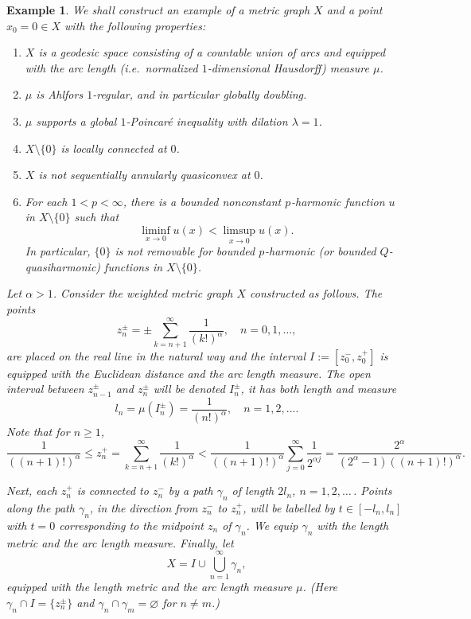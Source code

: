 \documentclass[a4paper,twoside]{article}
\theoremstyle{propositional}
\theoremstyle{descriptive}
\newtheorem{example}[thm]{Example}
\theoremstyle{remarkstyle}
\newcommand{\setm}{\setminus}
\renewcommand{\emptyset}{\varnothing}
\newcommand{\al}{\alpha}
\newcommand{\ga}{\gamma}
\newcommand{\la}{\lambda}
\newcommand{\p}{{$p\mspace{1mu}$}}
\newcommand{\zpm}{z^\pm}
\newcommand{\zpl}{z^+}
\newcommand{\zmin}{z^-}
\newcommand{\Ipm}{I^\pm}
\numberwithin{equation}{section}
\begin{document}
\begin{example}  \label{ex-factorial2}
We shall construct
an example of a metric graph $X$ and a point $x_0=0 \in X$ 
with the following properties:
\begin{enumerate}
\item \label{e-1}
$X$ is a geodesic space consisting of a
countable union of arcs and equipped with the arc length 
(i.e.\ normalized $1$-dimensional Hausdorff) 
measure $\mu$. 
\item \label{e-2}
$\mu$ is Ahlfors $1$-regular, and in particular globally doubling.
\item \label{e-3}
$\mu$ supports a global $1$-Poincar\'e inequality with dilation $\la=1$.
\item \label{e-4}
$X \setm \{0\}$ is locally connected at $0$.
\item \label{e-5}
$X $ is not sequentially annularly quasiconvex at $0$.
\item \label{e-6} 
For each $1<p<\infty$, 
there is a bounded nonconstant \p-harmonic function $u$ in $X \setm \{0\}$
such that 
\[
 \liminf_{x\to0} u(x) < \limsup_{x\to0} u(x). 
\]
In particular, $\{0\}$ is not removable for
bounded \p-harmonic (or bounded $Q$-quasiharmonic) functions
in $X \setm \{0\}$.
\end{enumerate}




Let $\al>1$. 
Consider the weighted metric graph $X$ constructed as follows.
The points 
\[
\zpm_n=\pm \sum_{k=n+1}^\infty \frac{1}{(k!)^\al}, \quad 
n=0,1,\dots, 
\] 
are placed on the real line in the natural way and the interval 
$I:=[\zmin_0,\zpl_0]$ is 
equipped with the Euclidean distance and the arc length
measure.
The open interval between $\zpm_{n-1}$ and $\zpm_n$ will be
denoted $\Ipm_n$, it has both length and measure 
\[
l_n=  \mu(\Ipm_n) =   \frac{1}{(n!)^\al}, \quad n=1,2,\dots.
\]
Note that for $n\ge1$,
\begin{equation*}
\frac{1}{((n+1)!)^\al} \le
\zpl_n = \sum_{k=n+1}^\infty \frac{1}{(k!)^\al}
< \frac{1}{((n+1)!)^\al}  \sum_{j=0}^\infty \frac{1}{2^{\al j}}
= \frac{2^\al}{(2^\al-1)((n+1)!)^\al}.
\end{equation*}

Next, each $\zpl_n$ is connected to $\zmin_n$ by a path $\ga_n$ of
length $2l_n$, $n=1,2,\dots$\,. 
Points along the path $\ga_n$, in the direction from $\zmin_n$ to $\zpl_n$,
will be labelled by $t\in [-l_n,l_n]$ with $t=0$ corresponding
to the midpoint $z_n$ of $\ga_n$.
We equip $\ga_n$ with the length metric and the 
arc length measure.
Finally, let 
\[
X= I \cup \bigcup_{n=1}^\infty \ga_n,
\]
equipped with the length metric and the 
arc length 
measure $\mu$.
(Here $\ga_n \cap I=\{\zpm_n\}$ and $\ga_n \cap \ga_m=\emptyset$ 
for $n \ne m$.)


\end{example}
\end{document}
